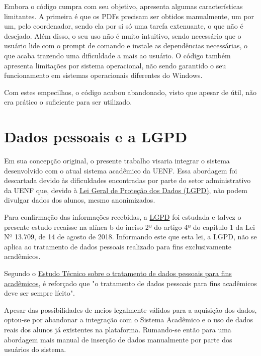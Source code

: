         Embora o código cumpra com seu objetivo, apresenta algumas características limitantes. A primeira é que os PDFs precisam ser obtidos manualmente, um por um, pelo coordenador, sendo ela por si só uma tarefa extenuante, o que não é desejado. Além disso, o seu uso não é muito intuitivo, sendo necessário que o usuário lide com o prompt de comando e instale as dependências necessárias, o que acaba trazendo uma dificuldade a mais ao usuário. O código também apresenta limitações por sistema operacional, não sendo garantido o seu funcionamento em sistemas operacionais diferentes do Windows.

        Com estes empecilhos, o código acabou abandonado, visto que apesar de útil, não era prático o suficiente para ser utilizado.

\section{Dados pessoais e a LGPD} %

    Em sua concepção original, o presente trabalho visaria integrar o sistema desenvolvido com o atual sistema acadêmico da UENF. Essa abordagem foi descartada devido às dificuldades encontradas por parte do setor administrativo da UENF que, devido à \href{https://www.planalto.gov.br/ccivil_03/_ato2015-2018/2018/lei/l13709.htm}{Lei Geral de Proteção dos Dados (LGPD)}, não podem divulgar dados dos alunos, mesmo anonimizados.

    Para confirmação das informações recebidas, a \href{https://www.planalto.gov.br/ccivil_03/_ato2015-2018/2018/lei/l13709.htm}{LGPD} foi estudada e talvez o presente estudo recaísse na alínea b do inciso 2º do artigo 4º do capítulo 1 da Lei Nº 13.709, de 14 de agosto de 2018. Informando este que esta lei, a LGPD, não se aplica ao tratamento de dados pessoais realizado para fins exclusivamente acadêmicos.

    Segundo o \href{https://www.gov.br/anpd/pt-br/assuntos/noticias/sei_00261-000810_2022_17.pdf}{Estudo Técnico sobre o tratamento de dados pessoais para fins acadêmicos}, é reforçado que "o tratamento de dados pessoais para fins acadêmicos deve ser sempre lícito".

    Apesar das possibilidades de meios legalmente válidos para a aquisição dos dados, optou-se por abandonar a integração com o Sistema Acadêmico e o uso de dados reais dos alunos já existentes na plataforma. Rumando-se então para uma abordagem mais manual de inserção de dados manualmente por parte dos usuários do sistema.

